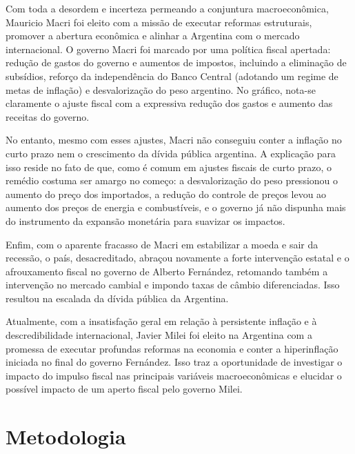 \documentclass[a4paper, 12pt, openany, oneside, brazil]{abntex2}
\begin{document}
Com toda a desordem e incerteza permeando a conjuntura macroeconômica, Mauricio Macri foi eleito com a missão de executar reformas estruturais, promover a abertura econômica e alinhar a Argentina com o mercado internacional. O governo Macri foi marcado por uma política fiscal apertada: redução de gastos do governo e aumentos de impostos, incluindo a eliminação de subsídios, reforço da independência do Banco Central (adotando um regime de metas de inflação) e desvalorização do peso argentino. No gráfico, nota-se claramente o ajuste fiscal com a expressiva redução dos gastos e aumento das receitas do governo.

No entanto, mesmo com esses ajustes, Macri não conseguiu conter a inflação no curto prazo nem o crescimento da dívida pública argentina. A explicação para isso reside no fato de que, como é comum em ajustes fiscais de curto prazo, o remédio costuma ser amargo no começo: a desvalorização do peso pressionou o aumento do preço dos importados, a redução do controle de preços levou ao aumento dos preços de energia e combustíveis, e o governo já não dispunha mais do instrumento da expansão monetária para suavizar os impactos.

Enfim, com o aparente fracasso de Macri em estabilizar a moeda e sair da recessão, o país, desacreditado, abraçou novamente a forte intervenção estatal e o afrouxamento fiscal no governo de Alberto Fernández, retomando também a intervenção no mercado cambial e impondo taxas de câmbio diferenciadas. Isso resultou na escalada da dívida pública da Argentina.

Atualmente, com a insatisfação geral em relação à persistente inflação e à descredibilidade internacional, Javier Milei foi eleito na Argentina com a promessa de executar profundas reformas na economia e conter a hiperinflação iniciada no final do governo Fernández. Isso traz a oportunidade de investigar o impacto do impulso fiscal nas principais variáveis macroeconômicas e elucidar o possível impacto de um aperto fiscal pelo governo Milei.


\chapter{Metodologia}
\end{document}
